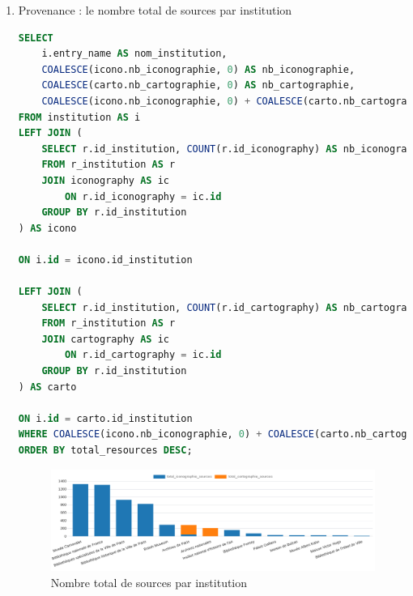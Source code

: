 \begin{enumerate}
\begin{enumerate}
\newpage      

        \item Provenance : le nombre total de sources par institution            
            \begin{lstlisting}[language=SQL, caption=Nombre total de sources par institution]
SELECT 
    i.entry_name AS nom_institution,
    COALESCE(icono.nb_iconographie, 0) AS nb_iconographie,
    COALESCE(carto.nb_cartographie, 0) AS nb_cartographie,
    COALESCE(icono.nb_iconographie, 0) + COALESCE(carto.nb_cartographie, 0) AS total_resources
FROM institution AS i
LEFT JOIN (
    SELECT r.id_institution, COUNT(r.id_iconography) AS nb_iconographie
    FROM r_institution AS r 
    JOIN iconography AS ic 
        ON r.id_iconography = ic.id 
    GROUP BY r.id_institution
) AS icono 

ON i.id = icono.id_institution

LEFT JOIN (
    SELECT r.id_institution, COUNT(r.id_cartography) AS nb_cartographie 
    FROM r_institution AS r 
    JOIN cartography AS ic 
        ON r.id_cartography = ic.id 
    GROUP BY r.id_institution
) AS carto 

ON i.id = carto.id_institution
WHERE COALESCE(icono.nb_iconographie, 0) + COALESCE(carto.nb_cartographie, 0) > 50
ORDER BY total_resources DESC; \end{lstlisting}
\begin{figure}[ht!]
    \centering
    \includegraphics[width=1\linewidth]{images/graphiques/total_source_institution.png}
    \caption{Nombre total de sources par institution}
    \label{fig:total_sources_institution}
\end{figure}




\end{enumerate}
\end{enumerate}
